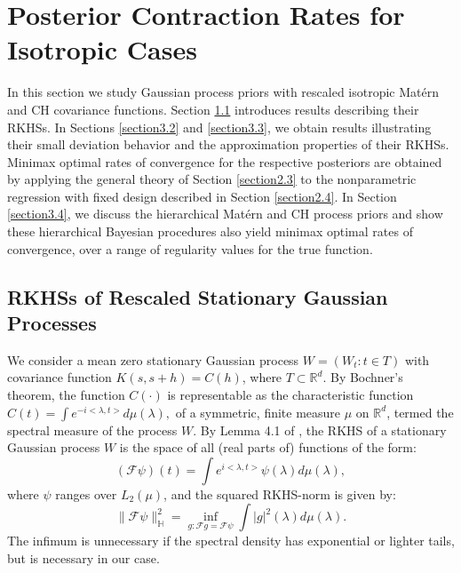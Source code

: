 \documentclass[ejs,noshowframe]{imsart}
\theoremstyle{plain}
\theoremstyle{definition}
\theoremstyle{remark}
\begin{document}
\section{Posterior Contraction Rates for Isotropic Cases}\label{section3}
In this section we study Gaussian process priors with rescaled isotropic Mat\'ern  and CH covariance functions. Section \ref{rescaled measure section} introduces results describing their RKHSs. In  Sections \ref{section3.2} and \ref{section3.3}, we obtain results
illustrating their small deviation behavior and the approximation properties of their
RKHSs. Minimax optimal rates of convergence for the respective posteriors are obtained by  applying the general theory of Section \ref{section2.3} to the nonparametric regression with fixed design described in Section \ref{section2.4}.
In Section \ref{section3.4}, we discuss the hierarchical  Mat\'ern  and CH process priors and show these hierarchical Bayesian procedures also yield minimax optimal rates of convergence, over a range of regularity values for the true function.




\subsection{RKHSs of Rescaled Stationary Gaussian Processes}\label{rescaled measure section}
We consider  a mean zero stationary Gaussian process $W=(W_t: t \in T)$ with covariance function $K(s,s+h)=C(h)$, where $T \subset \mathbb{R}^d$.
By Bochner's theorem, the function $C(\cdot)$ is representable as the characteristic function
$
C(t)=\int e^{-i <\lambda,t>} d \mu(\lambda),
$
of a symmetric, finite measure $\mu$ on $\mathbb{R}^d$, termed the spectral measure of the process $W$.   By Lemma 4.1 of \cite{van2009adaptive}, the RKHS of a stationary Gaussian  process $W$ is  the space of all (real parts of) functions of the form:
\begin{equation}
(\mathcal{F}\psi)(t)= \int e^{{i} <\lambda, t>}\psi(\lambda)  d\mu(\lambda), \label{fourier trans}
\end{equation}
where $\psi$ ranges over $L_2(\mu)$, and  the squared RKHS-norm is given by:
\begin{equation}
    \|\mathcal{F} \psi\|_{\mathbb{H}}^2  =\inf _{g: \mathcal{F}g=\mathcal{F}\psi} \int|g|^2(\lambda)  d\mu (\lambda). \label{rkhs norm}
\end{equation}
The infimum is unnecessary if the spectral density has exponential or lighter tails, but is necessary in our case.
\end{document}
